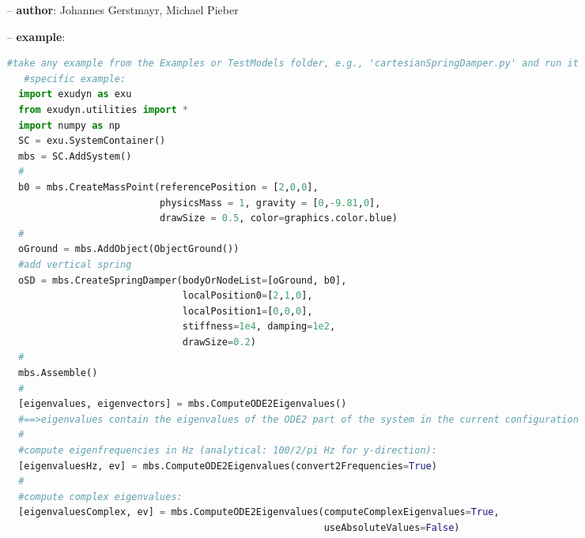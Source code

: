 \begin{itemize}[leftmargin=0.7cm]
\item[--]
{\bf author}: Johannes Gerstmayr, Michael Pieber
\item[--]
{\bf example}: \vspace{-12pt}\ei\begin{lstlisting}[language=Python, xleftmargin=36pt]
   #take any example from the Examples or TestModels folder, e.g., 'cartesianSpringDamper.py' and run it
   #specific example:
  import exudyn as exu
  from exudyn.utilities import *
  import numpy as np
  SC = exu.SystemContainer()
  mbs = SC.AddSystem()
  #
  b0 = mbs.CreateMassPoint(referencePosition = [2,0,0],
                           physicsMass = 1, gravity = [0,-9.81,0],
                           drawSize = 0.5, color=graphics.color.blue)
  #
  oGround = mbs.AddObject(ObjectGround())
  #add vertical spring
  oSD = mbs.CreateSpringDamper(bodyOrNodeList=[oGround, b0],
                               localPosition0=[2,1,0],
                               localPosition1=[0,0,0],
                               stiffness=1e4, damping=1e2,
                               drawSize=0.2)
  #
  mbs.Assemble()
  #
  [eigenvalues, eigenvectors] = mbs.ComputeODE2Eigenvalues()
  #==>eigenvalues contain the eigenvalues of the ODE2 part of the system in the current configuration
  #
  #compute eigenfrequencies in Hz (analytical: 100/2/pi Hz for y-direction):
  [eigenvaluesHz, ev] = mbs.ComputeODE2Eigenvalues(convert2Frequencies=True)
  #
  #compute complex eigenvalues:
  [eigenvaluesComplex, ev] = mbs.ComputeODE2Eigenvalues(computeComplexEigenvalues=True,
                                                        useAbsoluteValues=False)
\end{lstlisting}\vspace{-24pt}\bi\item[]\vspace{-24pt}\vspace{12pt}\end{itemize}
%

